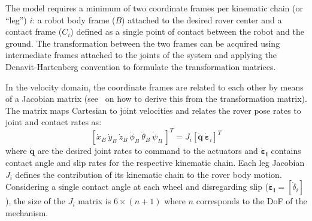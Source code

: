 \documentclass[a4paper,twocolumn]{esapub2005} %
\begin{document}
The model requires a minimum of two coordinate frames per kinematic chain (or 
``leg'') $i$: a
robot body frame ($B$) attached to the desired rover center and a contact frame
($C_{i}$) defined as a single point of contact between the robot and the
ground. The transformation between the two frames can be acquired using 
intermediate frames attached to the joints of the system and applying the 
Denavit-Hartenberg convention to formulate the transformation matrices.

In the velocity domain, the coordinate frames are related to each other by 
means of a Jacobian matrix (see~\cite{Tarokh2005} on how to derive this from 
the transformation matrix). The matrix maps Cartesian to joint
velocities and relates the rover pose rates to joint and contact rates as:
\begin{equation}
	\left[\dot{x}_{B} ~ \dot{y}_{B} ~ \dot{z}_{B} ~ \dot{\phi}_{B}
	~ \dot{\theta}_{B} ~ \dot{\psi}_{B} ~ \right]^T = J_{i}
	\left[\boldsymbol{\dot{q}} ~ \boldsymbol{\dot{\varepsilon}}_{i} \right]^T
	\label{eq:wheeljacobian}
\end{equation}
where $\boldsymbol{\dot{q}}$ are the desired joint rates to command to the
actuators and $\boldsymbol{\dot{\varepsilon}_{i}}$ contains contact angle and 
slip rates for the respective kinematic chain. Each leg Jacobian $J_{i}$ 
defines the
contribution of its kinematic chain to the rover body motion. Considering a 
single contact angle at each wheel and disregarding slip 
($\boldsymbol{\dot{\varepsilon}_{i}} = [\dot{\delta}_{i}]$), the size of the 
$J_{i}$
matrix is $6 \times (n + 1)$ where $n$ corresponds to the DoF of the
mechanism.
\end{document}
